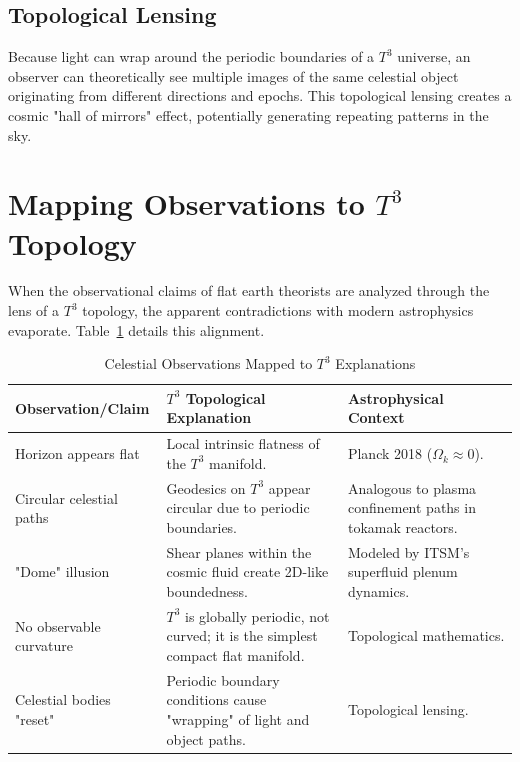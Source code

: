 \documentclass[aps,prd,11pt,onecolumn,superscriptaddress,nofootinbib,floatfix]{revtex4-2}
\begin{document}
\subsection{Topological Lensing}
Because light can wrap around the periodic boundaries of a $T^3$ universe, an observer can theoretically see multiple images of the same celestial object originating from different directions and epochs. This topological lensing creates a cosmic "hall of mirrors" effect, potentially generating repeating patterns in the sky.

\section{Mapping Observations to $T^3$ Topology}
\label{sec:mapping}

When the observational claims of flat earth theorists are analyzed through the lens of a $T^3$ topology, the apparent contradictions with modern astrophysics evaporate. Table~\ref{tab:mapping} details this alignment.

\begin{table}[h]
\centering
\caption{Celestial Observations Mapped to $T^3$ Explanations}
\label{tab:mapping}
\begin{tabular}{p{} p{} p{}}
\toprule
\textbf{Observation/Claim} & \textbf{$T^3$ Topological Explanation} & \textbf{Astrophysical Context} \\
\midrule
Horizon appears flat & Local intrinsic flatness of the $T^3$ manifold. & Planck 2018 ($\Omega_k \approx 0$). \\
Circular celestial paths & Geodesics on $T^3$ appear circular due to periodic boundaries. & Analogous to plasma confinement paths in tokamak reactors. \\
"Dome" illusion & Shear planes within the cosmic fluid create 2D-like boundedness. & Modeled by ITSM's superfluid plenum dynamics. \\
No observable curvature & $T^3$ is globally periodic, not curved; it is the simplest compact flat manifold. & Topological mathematics. \\
Celestial bodies "reset" & Periodic boundary conditions cause "wrapping" of light and object paths. & Topological lensing. \\
\bottomrule
\end{tabular}
\end{table}
\end{document}
